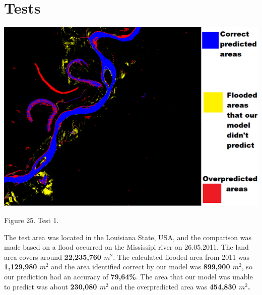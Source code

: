\documentclass[12pt, a4paper]{report}
\begin{document}
\newpage


\chapter{Tests}


\bigskip
\includegraphics[scale=0.55, center]{test_1_1.png}
\begin{center}
Figure 25. Test 1.
\end{center}
\par 

The test area was located in the Louisiana State, USA, and the comparison was made based on a flood occurred on the Mississipi river on 26.05.2011. The land area covers around \textbf{22,235,760 $m^2$}. The calculated flooded area from 2011 was \textbf{1,129,980 $m^2$} and the area identified correct by our model was \textbf{899,900 $m^2$}, so our prediction had an accuracy of \textbf{79,64\%}. The area that our model was unable to predict was about \textbf{230,080 $m^2$} and the overpredicted area was \textbf{454,830 $m^2$.}

\newpage
\end{document}
